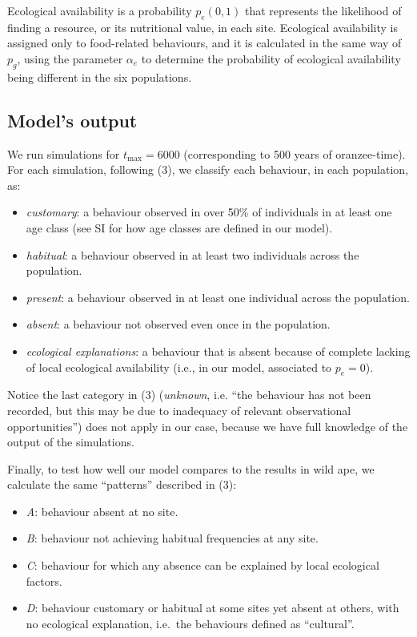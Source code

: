 \documentclass[9pt,twocolumn,twoside,]{pnas-new}
\begin{document}
Ecological availability is a probability \(p_e(0,1)\) that represents
the likelihood of finding a resource, or its nutritional value, in each
site. Ecological availability is assigned only to food-related
behaviours, and it is calculated in the same way of \(p_g\), using the
parameter \(\alpha_e\) to determine the probability of ecological
availability being different in the six populations.

\subsection*{Model's output}\label{format}

We run simulations for \(t_\text{max}=6000\) (corresponding to 500 years
of oranzee-time). For each simulation, following (3), we classify each
behaviour, in each population, as:

\begin{itemize}
\item
  \emph{customary}: a behaviour observed in over 50\% of individuals in
  at least one age class (see SI for how age classes are defined in our
  model).
\item
  \emph{habitual}: a behaviour observed in at least two individuals
  across the population.
\item
  \emph{present}: a behaviour observed in at least one individual across
  the population.
\item
  \emph{absent}: a behaviour not observed even once in the population.
\item
  \emph{ecological explanations}: a behaviour that is absent because of
  complete lacking of local ecological availability (i.e., in our model,
  associated to \(p_e=0\)).
\end{itemize}

Notice the last category in (3) (\emph{unknown}, i.e. ``the behaviour
has not been recorded, but this may be due to inadequacy of relevant
observational opportunities'') does not apply in our case, because we
have full knowledge of the output of the simulations.

Finally, to test how well our model compares to the results in wild ape,
we calculate the same ``patterns'' described in (3):

\begin{itemize}
\item
  \emph{A}: behaviour absent at no site.
\item
  \emph{B}: behaviour not achieving habitual frequencies at any site.
\item
  \emph{C}: behaviour for which any absence can be explained by local
  ecological factors.
\item
  \emph{D}: behaviour customary or habitual at some sites yet absent at
  others, with no ecological explanation, i.e.~the behaviours defined as
  ``cultural''.
\end{itemize}
\end{document}
